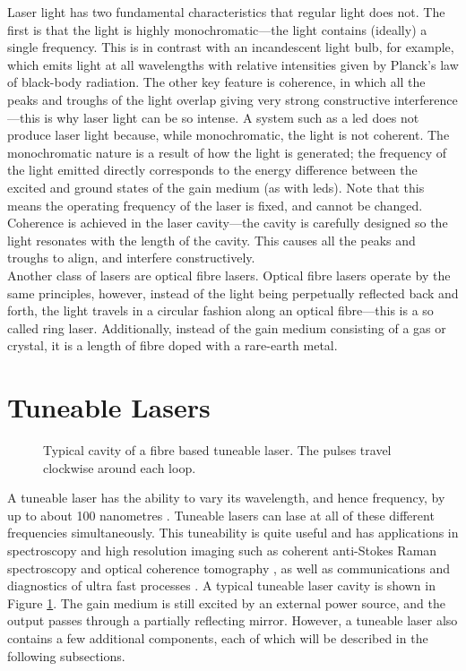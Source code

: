 Laser light has two fundamental characteristics that regular light does not. The first is that the light is highly monochromatic---the light contains (ideally) a single frequency. This is in contrast with an incandescent light bulb, for example, which emits light at all wavelengths with relative intensities given by Planck's law of black-body radiation. The other key feature is coherence, in which all the peaks and troughs of the light overlap giving very strong constructive interference---this is why laser light can be so intense. A system such as a \gls{led} does not produce laser light because, while monochromatic, the light is not coherent. The monochromatic nature is a result of how the light is generated; the frequency of the light emitted directly corresponds to the energy difference between the excited and ground states of the gain medium (as with \gls{led}s). Note that this means the operating frequency of the laser is fixed, and cannot be changed. Coherence is achieved in the laser cavity---the cavity is carefully designed so the light resonates with the length of the cavity. This causes all the peaks and troughs to align, and interfere constructively. \\

Another class of lasers are optical fibre lasers. Optical fibre lasers operate by the same principles, however, instead of the light being perpetually reflected back and forth, the light travels in a circular fashion along an optical fibre---this is a so called ring laser. Additionally, instead of the gain medium consisting of a gas or crystal, it is a length of fibre doped with a rare-earth metal. \\

\section{Tuneable Lasers}
\begin{figure}[tbp]
\centering

\caption[Typical cavity of a tuneable laser.]{Typical cavity of a fibre based tuneable laser. The pulses travel clockwise around each loop.}
\label{fig:cavity}
\end{figure}

A tuneable laser has the ability to vary its wavelength, and hence frequency, by up to about 100 nanometres \cite{bohun, burgoyne2010, yamashita}. Tuneable lasers can lase at all of these different frequencies simultaneously. This tuneability is quite useful and has applications in spectroscopy and high resolution imaging such as coherent anti-Stokes Raman spectroscopy and optical coherence tomography \cite{bohun, burgoyne2014, yamashita}, as well as communications and diagnostics of ultra fast processes \cite{silfvast}. A typical tuneable laser cavity is shown in Figure \ref{fig:cavity}. The gain medium is still excited by an external power source, and the output passes through a partially reflecting mirror. However, a tuneable laser also contains a few additional components, each of which will be described in the following subsections. 

